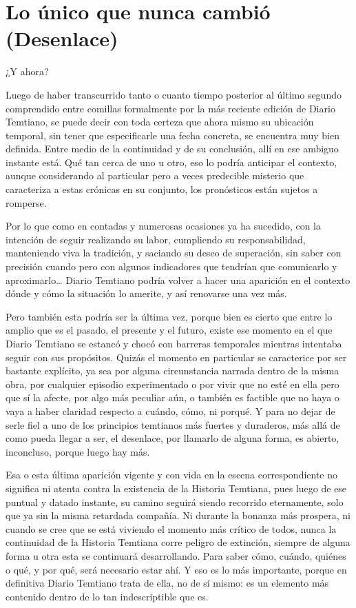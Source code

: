 \documentclass[
  spanish,
]{book}
\begin{document}
\hypertarget{lo-uxfanico-que-nunca-cambiuxf3-desenlace}{%
\chapter{Lo único que nunca cambió (Desenlace)}\label{lo-uxfanico-que-nunca-cambiuxf3-desenlace}}

¿Y ahora?

Luego de haber transcurrido tanto o cuanto tiempo posterior al último segundo comprendido entre comillas formalmente por la más reciente edición de Diario Temtiano, se puede decir con toda certeza que ahora mismo su ubicación temporal, sin tener que especificarle una fecha concreta, se encuentra muy bien definida. Entre medio de la continuidad y de su conclusión, allí en ese ambiguo instante está. Qué tan cerca de uno u otro, eso lo podría anticipar el contexto, aunque considerando al particular pero a veces predecible misterio que caracteriza a estas crónicas en su conjunto, los pronósticos están sujetos a romperse.

Por lo que como en contadas y numerosas ocasiones ya ha sucedido, con la intención de seguir realizando su labor, cumpliendo su responsabilidad, manteniendo viva la tradición, y saciando su deseo de superación, sin saber con precisión cuando pero con algunos indicadores que tendrían que comunicarlo y aproximarlo\ldots{} Diario Temtiano podría volver a hacer una aparición en el contexto dónde y cómo la situación lo amerite, y así renovarse una vez más.

Pero también esta podría ser la última vez, porque bien es cierto que entre lo amplio que es el pasado, el presente y el futuro, existe ese momento en el que Diario Temtiano se estancó y chocó con barreras temporales mientras intentaba seguir con sus propósitos. Quizás el momento en particular se caracterice por ser bastante explícito, ya sea por alguna circunstancia narrada dentro de la misma obra, por cualquier episodio experimentado o por vivir que no esté en ella pero que sí la afecte, por algo más peculiar aún, o también es factible que no haya o vaya a haber claridad respecto a cuándo, cómo, ni porqué. Y para no dejar de serle fiel a uno de los principios temtianos más fuertes y duraderos, más allá de como pueda llegar a ser, el desenlace, por llamarlo de alguna forma, es abierto, inconcluso, porque luego hay más.

Esa o esta última aparición vigente y con vida en la escena correspondiente no significa ni atenta contra la existencia de la Historia Temtiana, pues luego de ese puntual y datado instante, su camino seguirá siendo recorrido eternamente, solo que ya sin la misma retardada compañía. Ni durante la bonanza más prospera, ni cuando se cree que se está viviendo el momento más crítico de todos, nunca la continuidad de la Historia Temtiana corre peligro de extinción, siempre de alguna forma u otra esta se continuará desarrollando. Para saber cómo, cuándo, quiénes o qué, y por qué, será necesario estar ahí. Y eso es lo más importante, porque en definitiva Diario Temtiano trata de ella, no de sí mismo: es un elemento más contenido dentro de lo tan indescriptible que es.
\end{document}
